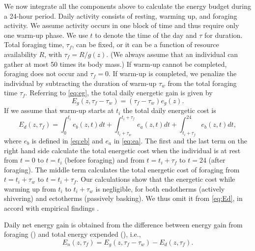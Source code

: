 We now integrate all the components above to calculate the energy budget during a 24-hour period.
Daily activity consists of resting, warming up, and foraging activity.
We assume activity occurs in one block of time and thus require only one warm-up phase. %
We use $t$ to denote the time of the day and $\tau$ for duration.
Total foraging time, $\tau_f$, can be fixed, or it can be a function of resource availability $R$, with $\tau_f = R/g(z)$.
(We always assume that an individual can gather at most 50 times its body mass.)
If warm-up cannot be completed, foraging does not occur and $\tau_f = 0$.
If warm-up is completed, we penalize the individual by subtracting the duration of warm-up $\tau_w$ from the total foraging time $\tau_f$.
Referring to \cref{eq:eg}, the total daily energetic gain is given by
\begin{equation} \label{eq:Eg}
	E_g(z,\tau_f - \tau_w) = (\tau_f - \tau_w) e_g(z).
\end{equation}
If we assume that warm-up starts at $t_i$ the total daily energetic cost is
\begin{equation} \label{eq:Ed}
	E_d(z, \tau_f) = \int_0^{t_i} e_b(z, t) dt + \int_{t_i + \tau_w}^{t_i + \tau_f } e_a(z,t) dt + \int_{t_i+\tau_f}^{24} e_b(z, t) dt,
\end{equation}
where $e_b$ is defined in \cref{eq:eb}  and $e_a$ in \cref{eq:ea}.
The first and the last term on the right hand side calculate the total energetic cost when the individual is at rest from $t = 0$ to $t = t_i$ (before foraging) and from $t = t_i + \tau_f$ to $t = 24$ (after foraging).
The middle term calculates the total energetic cost of foraging from $t = t_i + \tau_w$ to $t = t_i + \tau_f$.
Our calculations show that the energetic cost while warming up from $t_i$ to $t_i + \tau_w$ is negligible, for both endotherms (actively shivering) and ectotherms (passively basking).
We thus omit it from \cref{eq:Ed}, in accord with empirical findings \citep{Heinrich1975}.

Daily net energy gain is obtained from the difference between energy gain from foraging () and total energy expended (), i.e.,
\[
	E_n(z, \tau_f) = E_g(z,\tau_f- \tau_w) - E_d(z, \tau_f).
\]

